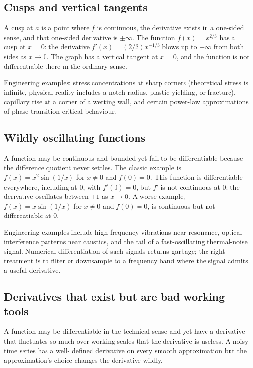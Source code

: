 \subsection{Cusps and vertical tangents}

A cusp at $a$ is a point where $f$ is continuous, the derivative
exists in a one-sided sense, and that one-sided derivative is
$\pm\infty$. The function $f(x) = x^{2/3}$ has a cusp at $x = 0$:
the derivative $f'(x) = (2/3) x^{-1/3}$ blows up to $+\infty$ from
both sides as $x \to 0$. The graph has a vertical tangent at $x =
0$, and the function is not differentiable there in the ordinary
sense.

Engineering examples: stress concentrations at sharp corners
(theoretical stress is infinite, physical reality includes a
notch radius, plastic yielding, or fracture), capillary rise at
a corner of a wetting wall, and certain power-law approximations
of phase-transition critical behaviour.

\subsection{Wildly oscillating functions}

A function may be continuous and bounded yet fail to be
differentiable because the difference quotient never settles. The
classic example is $f(x) = x^{2} \sin(1/x)$ for $x \neq 0$ and
$f(0) = 0$. This function is differentiable everywhere, including
at $0$, with $f'(0) = 0$, but $f'$ is not continuous at $0$: the
derivative oscillates between $\pm 1$ as $x \to 0$. A worse
example, $f(x) = x \sin(1/x)$ for $x \neq 0$ and $f(0) = 0$, is
continuous but not differentiable at $0$.

Engineering examples include high-frequency vibrations near
resonance, optical interference patterns near caustics, and the
tail of a fast-oscillating thermal-noise signal. Numerical
differentiation of such signals returns garbage; the right
treatment is to filter or downsample to a frequency band where
the signal admits a useful derivative.

\subsection{Derivatives that exist but are bad working tools}

A function may be differentiable in the technical sense and yet
have a derivative that fluctuates so much over working scales
that the derivative is useless. A noisy time series has a well-
defined derivative on every smooth approximation but the
approximation's choice changes the derivative wildly.

